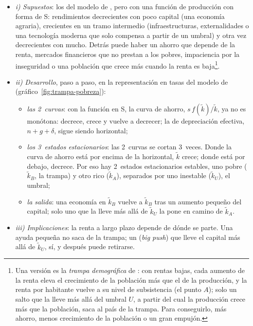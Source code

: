 \documentclass[11pt]{article}
\begin{document}
\begin{itemize}
\item \emph{i) Supuestos}: los del modelo de , pero con una función de producción con forma de S: rendimientos decrecientes con poco capital (una economía agraria), crecientes en un tramo intermedio (infraestructuras, externalidades o una tecnología moderna que solo compensa a partir de un umbral) y otra vez decrecientes con mucho\nocite{AzariadisDrazen1990}. Detrás puede haber un ahorro que depende de la renta, mercados financieros que no prestan a los pobres, impaciencia por la inseguridad o una población que crece más cuando la renta es baja\footnote{Una versión es la \emph{trampa demográfica} de \textcite{Nelson1956}: con rentas bajas, cada aumento de la renta eleva el crecimiento de la población más que el de la producción, y la renta por habitante vuelve a su nivel de subsistencia (el punto $A$); solo un salto que la lleve más allá del umbral $U$, a partir del cual la producción crece más que la población, saca al país de la trampa. Para conseguirlo, más ahorro, menos crecimiento de la población o un gran empujón.}.
\item \emph{ii) Desarrollo}, paso a paso, en la representación en tasas del modelo de   (gráfico~\ref{fig:trampa-pobreza}):
  \begin{itemize}
  \item \emph{las 2~curvas}: con la función en S, la curva de ahorro, $s\,f(\tilde k)/\tilde k$, ya no es monótona: decrece, crece y vuelve a decrecer; la de depreciación efectiva, $n+g+\delta$, sigue siendo horizontal;
  \item \emph{los 3~estados estacionarios}: las 2~curvas se cortan 3~veces. Donde la curva de ahorro está por encima de la horizontal, $\tilde k$ crece; donde está por debajo, decrece. Por eso hay 2~estados estacionarios estables, uno pobre ($\tilde k_B$, la trampa) y otro rico ($\tilde k_A$), separados por uno inestable ($\tilde k_U$), el umbral;
  \item \emph{la salida}: una economía en $\tilde k_B$ vuelve a $\tilde k_B$ tras un aumento pequeño del capital; solo uno que la lleve más allá de $\tilde k_U$ la pone en camino de $\tilde k_A$.
  \end{itemize}
\item \emph{iii) Implicaciones}: la renta a largo plazo depende de dónde se parte. Una ayuda pequeña no saca de la trampa; un  (\emph{big push}) que lleve el capital más allá de $\tilde k_U$, sí, y después puede retirarse.
\end{itemize}
\end{document}
